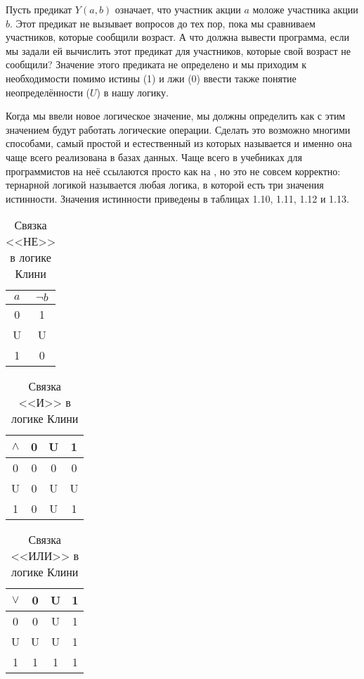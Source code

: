 Пусть предикат $Y(a, b)$ означает, что участник акции $a$ моложе участника акции $b$. Этот предикат не вызывает вопросов до тех пор, пока мы сравниваем участников, которые сообщили возраст. А что должна вывести программа, если мы задали ей вычислить этот предикат для участников, которые свой возраст не сообщили? Значение этого предиката не определено и мы приходим к необходимости помимо истины (1) и лжи (0) ввести также понятие неопределённости ($U$) в нашу логику.

Когда мы ввели новое логическое значение, мы должны определить как с этим значением будут работать логические операции. Сделать это возможно многими способами, самый простой и естественный из которых называется  и именно она чаще всего реализована в базах данных. Чаще всего в учебниках для программистов на неё ссылаются просто как на , но это не совсем корректно: тернарной логикой называется любая логика, в которой есть три значения истинности. Значения истинности приведены в таблицах 1.10, 1.11, 1.12 и 1.13.

\begin{table}[h]
\centering
\begin{tabular}{c | c}
$a$ & $\neg b$ \\
\hline
0 & 1 \\
U & U\\
1 & 0
\end{tabular}
\caption{Связка <<НЕ>> в логике Клини}\label{table:kleene-not}
\end{table}

\begin{table}[h]
\centering
\begin{tabular}{c | c c c}
$\land$ & 0 &U &1 \\
\hline
0 & 0 & 0 & 0 \\
U & 0 & U & U\\
1 & 0 & U & 1
\end{tabular}
\caption{Связка <<И>> в логике Клини}\label{table:kleene-and}
\end{table}

\begin{table}[h]
\centering
\begin{tabular}{c | c c c}
$\lor$ & 0 &U &1 \\
\hline
0 & 0 & U & 1 \\
U & U & U & 1\\
1 & 1 & 1 & 1
\end{tabular}
\caption{Связка <<ИЛИ>> в логике Клини}\label{table:kleene-or}
\end{table}

